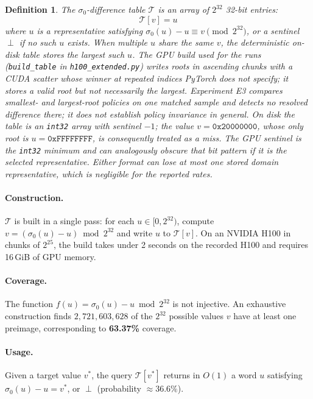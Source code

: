 \documentclass[11pt,a4paper]{article}
\newtheorem{definition}{Definition}
\newcommand{\sig}[1]{\sigma_{#1}}
\begin{document}
\begin{definition}
\label{def:table}
The \emph{$\sigma_0$-difference table} $\mathcal{T}$ is an array
of $2^{32}$ 32-bit entries:
\[
  \mathcal{T}[v] = u
\]
where $u$ is a representative satisfying $\sig{0}(u) - u \equiv v
\pmod{2^{32}}$, or a sentinel $\perp$ if no such $u$ exists.
When multiple $u$ share the same $v$, the deterministic on-disk table stores
the largest such $u$.  The GPU build used for the runs
(\texttt{build\_table} in \texttt{h100\_extended.py}) writes roots in
ascending chunks with a CUDA scatter whose winner at repeated indices PyTorch
does not specify; it stores a valid root but not necessarily the largest.
Experiment E3 compares smallest- and largest-root policies on one matched
sample and detects no resolved difference there; it does not establish policy
invariance in general.  On disk the table is an \texttt{int32} array with
sentinel $-1$; the value $v=\mathtt{0x20000000}$, whose only root is
$u=\mathtt{0xFFFFFFFF}$, is consequently treated as a miss.  The GPU sentinel
is the \texttt{int32} minimum and can analogously obscure that bit pattern if
it is the selected representative.  Either format can lose at most one stored
domain representative, which is negligible for the reported rates.
\end{definition}

\paragraph{Construction.}
$\mathcal{T}$ is built in a single pass: for each $u \in [0, 2^{32})$,
compute $v = (\sig{0}(u) - u) \bmod 2^{32}$ and write $u$ to
$\mathcal{T}[v]$.  On an NVIDIA H100 in chunks of $2^{25}$, the build
takes under 2 seconds on the recorded H100 and requires 16\,GiB of GPU memory.

\paragraph{Coverage.}
The function $f(u) = \sig{0}(u) - u \bmod 2^{32}$ is not injective.
An exhaustive construction finds $2{,}721{,}603{,}628$ of the $2^{32}$ possible values
$v$ have at least one preimage, corresponding to \textbf{63.37\%}
coverage.

\paragraph{Usage.}
Given a target value $v^*$, the query $\mathcal{T}[v^*]$ returns in
$O(1)$ a word $u$ satisfying $\sig{0}(u) - u = v^*$, or $\perp$
(probability $\approx 36.6\%$).
\end{document}
